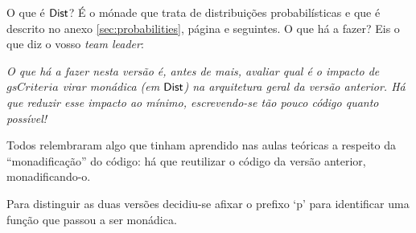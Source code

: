 \documentclass[a4paper]{article}
\newcommand{\Varid}[1]{\mathit{#1}}
\begin{document}
O que é \ensuremath{\fun{Dist}}? É o mónade que trata de distribuições probabilísticas e que é descrito no
anexo \ref{sec:probabilities}, página \pageref{sec:probabilities} e seguintes. O que há a fazer? Eis o que diz o vosso \emph{team leader}:

\begin{bquote}
\slshape
O que há a fazer nesta versão é, antes de mais, avaliar qual é o impacto
de \ensuremath{\Varid{gsCriteria}} virar monádica (em \ensuremath{\fun{Dist}}) na arquitetura geral da versão
anterior. Há que reduzir esse impacto ao mínimo, escrevendo-se tão pouco código
quanto possível!
\end{bquote}

Todos relembraram algo que tinham aprendido nas aulas teóricas a respeito
da ``monadificação'' do código: há que reutilizar o código da versão anterior,
monadificando-o.

Para distinguir as duas versões decidiu-se afixar o prefixo `p'  para identificar
uma função que passou a ser monádica.
\end{document}
